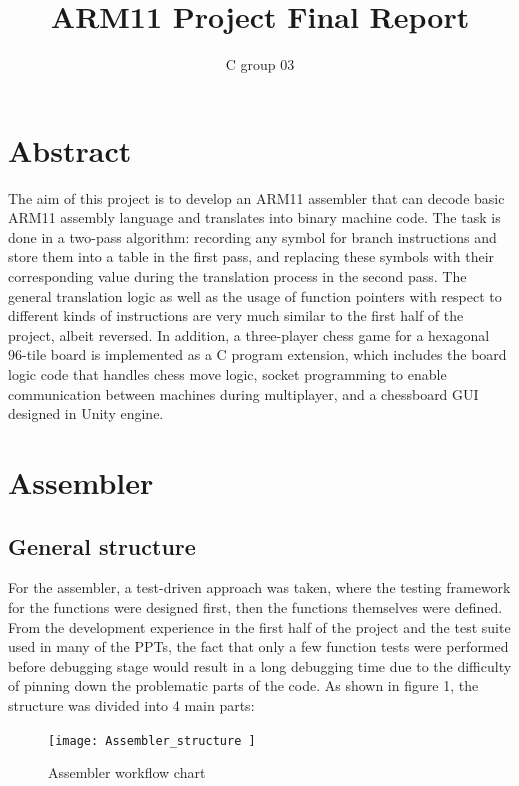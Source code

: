\documentclass[11pt]{article}
\begin{document}
\title{ARM11 Project Final Report}
\author{C group 03}

\maketitle

\section{Abstract}
The aim of this project is to develop an ARM11 assembler that can decode basic ARM11 assembly language and translates into binary machine code. The task is done in a two-pass algorithm: recording any symbol for branch instructions and store them into a table in the first pass, and replacing these symbols with their corresponding value during the translation process in the second pass. The general translation logic as well as the usage of function pointers with respect to different kinds of instructions are very much similar to the first half of the project, albeit reversed. In addition, a three-player chess game for a hexagonal 96-tile board is implemented as a C program extension, which includes the board logic code that handles chess move logic, socket programming to enable communication between machines during multiplayer, and a chessboard GUI designed in Unity engine.
\section{Assembler}
\subsection{General structure}
For the assembler, a test-driven approach was taken, where the testing framework for the functions were designed first, then the functions themselves were defined. From the development experience in the first half of the project and the test suite used in many of the PPTs, the fact that only a few function tests were performed before debugging stage would result in a long debugging time due to the difficulty of pinning down the problematic parts of the code.\newline
As shown in figure 1, the structure was divided into 4 main parts: 
    
\begin{figure}
\centering
\begin{minipage}{.5\textwidth}
\centering
\texttt{[image:  Assembler\_structure ]}
\caption{Assembler workflow chart}
\end{minipage}\hfill
\end{figure}
\end{document}
